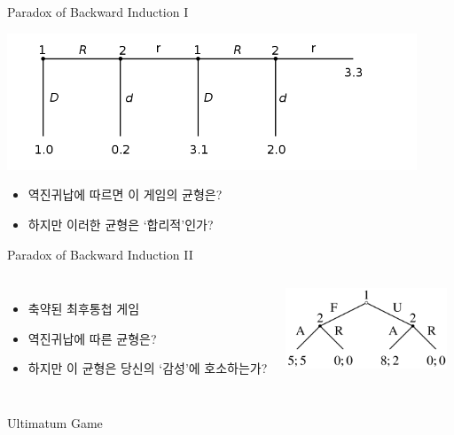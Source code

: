 \documentclass[final]{beamer}
\begin{document}
\begin{frame}[t]{Paradox of Backward Induction I}
	\begin{center}
	\includegraphics[width=33em]{centepede.png}
	\end{center}
	\begin{itemize}
		\item 역진귀납에 따르면 이 게임의 균형은?
		\item 하지만 이러한 균형은 `합리적'인가? 
	\end{itemize}
\end{frame}

\begin{frame}[t]{Paradox of Backward Induction II}
	\begin{columns}[c]
	\column{15em}
	\begin{itemize}
		\item 축약된 최후통첩 게임
		\item 역진귀납에 따른 균형은? 
		\item 하지만 이 균형은 당신의 `감성'에 호소하는가?
	\end{itemize}
	\column{15em} 
	\includegraphics[width=13em]{Ultimatum_Game_Extensive_Form.png}
	\end{columns}
\end{frame}

\begin{frame}[t]{Ultimatum Game}
	\begin{center}
	\end{center}
\end{frame}
\end{document}
